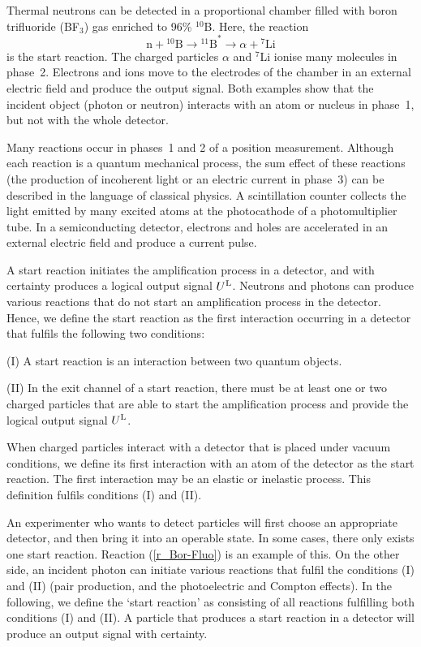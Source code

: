 \documentclass[11pt,a4paper]{article}
\begin{document}
Thermal neutrons can be detected in a proportional chamber filled with boron trifluoride (BF$_3$) gas enriched to 96\% $^{10}$B.  Here, the reaction 
%
\begin{equation}\label{r_Bor-Fluo} 
\mbox{n} + \mbox{$^{10}$B} \to \mbox{$^{11}$B}^* \to \alpha + \mbox{$^7$Li}  
\end{equation}
%
is the start reaction.  
The charged particles $\alpha$ and $^7$Li ionise many molecules in phase~2.  
Electrons and ions move to the electrodes of the chamber in an external electric field and produce the output signal.  
Both examples show that the incident object (photon or neutron) interacts with an atom or nucleus in phase~1, but not with the whole detector.  

Many reactions occur in phases~1 and 2 of a position measurement.  
Although each reaction is a quantum mechanical process, the sum effect of these reactions (the production of incoherent light or an electric current in phase~3) can be described in the language of classical physics.  
A scintillation counter collects the light emitted by many excited atoms at the photocathode of a photomultiplier tube.   
In a semiconducting detector, electrons and holes are accelerated in an external electric field and produce a current pulse.  
 
A start reaction initiates the amplification process in a detector, and with certainty produces a logical output signal $U^{\rm L}$.  
Neutrons and photons can produce various reactions that do not start an amplification process in the detector.  
Hence, we define the start reaction as the first interaction occurring in a detector that fulfils the following two conditions:  

(I) A start reaction is an interaction between two quantum objects.  

(II) In the exit channel of a start reaction, there must be at least one or two charged particles that are able to start the amplification process and provide the logical output signal $U^{\rm L}$.  

When charged particles interact with a detector that is placed under vacuum conditions, we define its first interaction with an atom of the detector as the start reaction.  The first interaction may be an elastic or inelastic process.  
This definition fulfils conditions (I) and (II).  

An experimenter who wants to detect particles will first choose an appropriate detector, and then bring it into an operable state.  In some cases, there only exists one start reaction. Reaction (\ref{r_Bor-Fluo}) is an example of this.  
On the other side, an incident photon can initiate various reactions that fulfil the conditions (I) and (II) (pair production, and the photoelectric and Compton effects).  In the following, we define the `start reaction' as consisting of all reactions fulfilling both conditions (I) and (II).  
A particle that produces a start reaction in a detector will produce an output signal with certainty.  
\end{document}
